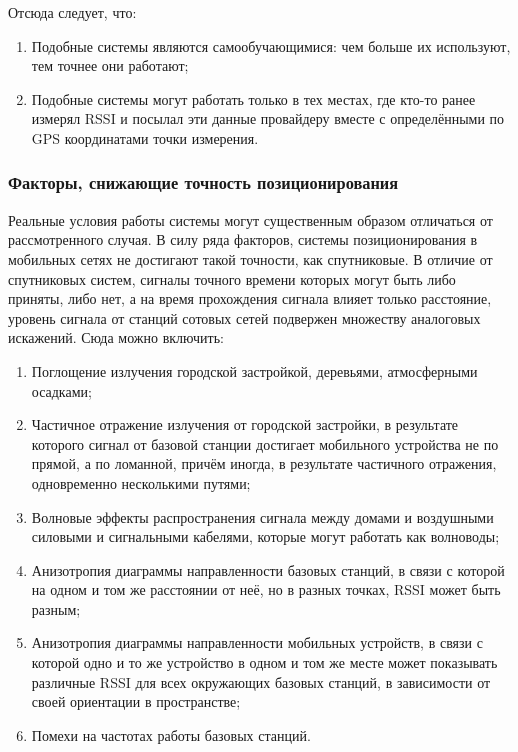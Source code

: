 Отсюда следует, что:

\begin{enumerate}
	\item
		Подобные системы являются самообучающимися: чем больше их используют, тем точнее они работают;
	\item
		Подобные системы могут работать только в тех местах, где кто-то ранее измерял RSSI и посылал эти данные провайдеру вместе с определёнными по GPS координатами точки измерения.
\end{enumerate}

\subsubsection{Факторы, снижающие точность позиционирования}
\label{subsubsec:pospreclow}
Реальные условия работы системы могут существенным образом отличаться от рассмотренного случая. В силу ряда факторов, системы позиционирования в мобильных сетях не достигают такой точности, как спутниковые. В отличие от спутниковых систем, сигналы точного времени которых могут быть либо приняты, либо нет, а на время прохождения сигнала влияет только расстояние, уровень сигнала от станций сотовых сетей подвержен множеству аналоговых искажений. Сюда можно включить:

\begin{enumerate}
	\item
		Поглощение излучения городской застройкой, деревьями, атмосферными осадками;
	\item
		Частичное отражение излучения от городской застройки, в результате которого сигнал от базовой станции достигает мобильного устройства не по прямой, а по ломанной, причём иногда, в результате частичного отражения, одновременно несколькими путями;
	\item
		Волновые эффекты распространения сигнала между домами и воздушными силовыми и сигнальными кабелями, которые могут работать как волноводы;
	\item
		Анизотропия диаграммы направленности базовых станций, в связи с которой на одном и том же расстоянии от неё, но в разных точках, RSSI может быть разным;
	\item
		Анизотропия диаграммы направленности мобильных устройств, в связи с которой одно и то же устройство в одном и том же месте может показывать различные RSSI для всех окружающих базовых станций, в зависимости от своей ориентации в пространстве;
	\item
		Помехи на частотах работы базовых станций.
\end{enumerate}

